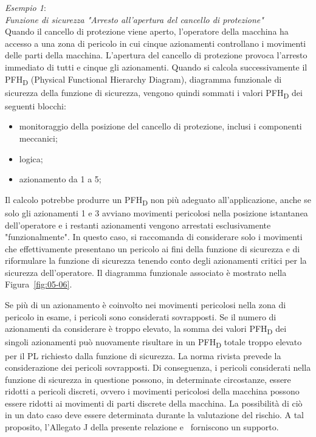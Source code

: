 \textit{Esempio 1}:\\
\textit{Funzione di sicurezza "Arresto all'apertura del cancello di protezione"} \\
Quando il cancello di protezione viene aperto, l'operatore della macchina ha accesso a una zona di pericolo in cui cinque azionamenti controllano i movimenti delle parti della macchina. L'apertura del cancello di protezione provoca l'arresto immediato di tutti e cinque gli azionamenti.
Quando si calcola successivamente il PFH\textsubscript{D} (Physical Functional Hierarchy Diagram), diagramma funzionale di sicurezza della funzione di sicurezza, vengono quindi sommati i valori PFH\textsubscript{D} dei seguenti blocchi:
	
\begin{itemize}
    \item monitoraggio della posizione del cancello di protezione, inclusi i componenti meccanici;
    \item logica;
    \item azionamento da 1 a 5;
\end{itemize}
Il calcolo potrebbe produrre un PFH\textsubscript{\small D} non più adeguato all'applicazione, anche se solo gli azionamenti 1 e 3 avviano movimenti pericolosi nella posizione istantanea dell'operatore e i restanti azionamenti vengono arrestati esclusivamente "funzionalmente". In questo caso, si raccomanda di considerare solo i movimenti che effettivamente presentano un pericolo ai fini della funzione di sicurezza e di riformulare la funzione di sicurezza tenendo conto degli azionamenti critici per la sicurezza dell'operatore. Il diagramma funzionale associato è mostrato nella Figura~\ref{fig:05-06}.

Se più di un azionamento è coinvolto nei movimenti pericolosi nella zona di pericolo in esame, i pericoli sono considerati sovrapposti. Se il numero di azionamenti da considerare è troppo elevato, la somma dei valori PFH\textsubscript{D} dei singoli azionamenti può nuovamente risultare in un PFH\textsubscript{D} totale troppo elevato per il PL richiesto dalla funzione di sicurezza. La norma rivista prevede la considerazione dei pericoli sovrapposti. Di conseguenza, i pericoli considerati nella funzione di sicurezza in questione possono, in determinate circostanze, essere ridotti a pericoli discreti, ovvero i movimenti pericolosi della macchina possono essere ridotti ai movimenti di parti discrete della macchina. La possibilità di ciò in un dato caso deve essere determinata durante la valutazione del rischio. A tal proposito, l'Allegato J della presente relazione e~\cite{apfeld2010} forniscono un supporto.

